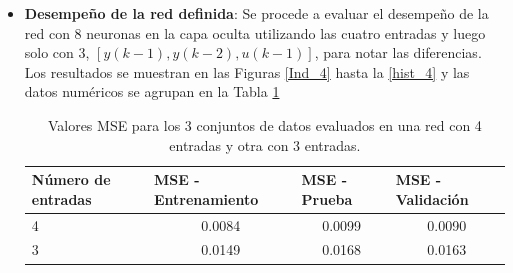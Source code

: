 \documentclass[12pt]{article}
\begin{document}
\begin{itemize}
	\clearpage
	
	\item \textbf{Desempeño de la red definida}: Se procede a evaluar el desempeño de la red con 8 neuronas en la capa oculta utilizando las cuatro entradas y luego solo con 3, $[y(k-1), y(k-2), u(k-1)]$, para notar las diferencias.
	Los resultados se muestran en las Figuras \ref{Ind_4} hasta la \ref{hist_4} y las datos numéricos se agrupan en la Tabla \ref{tabla_red_4_3}
	
	\begin{table}[h!]
		\centering
		\captionsetup{justification=centering}
		\caption{Valores MSE para los 3 conjuntos de datos evaluados en una red con 4 entradas y otra con 3 entradas.}
		\begin{tabular}{|l|c|c|c|}
			\hline
			Número de entradas & \multicolumn{1}{l|}{MSE - Entrenamiento} & \multicolumn{1}{l|}{MSE - Prueba} & \multicolumn{1}{l|}{MSE - Validación} \\ \hline
			4                  & 0.0084                                   & 0.0099                            & 0.0090                                \\ \hline
			3                  & 0.0149                                   & 0.0168                            & 0.0163                                \\ \hline
		\end{tabular}
	\label{tabla_red_4_3}
	\end{table}


\end{itemize}
\end{document}
